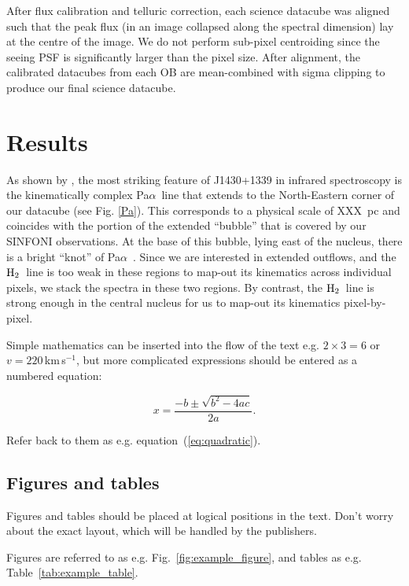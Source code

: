 \documentclass[a4paper,fleqn,usenatbib]{mnras}
\newcommand{\pa}{Pa$\alpha$}
\newcommand{\htwo}{${\rm H_{2}}$}
\begin{document}
After flux calibration and telluric correction, each science datacube was aligned such that the peak flux (in an image collapsed along the spectral dimension) lay at the centre of the image. We do not perform sub-pixel centroiding since the seeing PSF is significantly larger than the pixel size. After alignment, the calibrated datacubes from each OB are mean-combined with sigma clipping to produce our final science datacube.

\section{Results}
As shown by \cite{Ramos-Almeida17}, the most striking feature of J1430+1339 in infrared spectroscopy is the kinematically complex \pa\ line that extends to the North-Eastern corner of our datacube (see Fig. \ref{Pa}). This corresponds to a physical scale of XXX~pc and coincides with the portion of the extended ``bubble'' that is covered by our SINFONI observations. At the base of this bubble, lying east of the nucleus, there is a bright ``knot'' of \pa\ . Since we are interested in extended outflows, and the \htwo\ line is too weak in these regions to map-out its kinematics across individual pixels, we stack the spectra in these two regions. By contrast, the \htwo\ line is strong enough in the central nucleus for us to map-out its kinematics pixel-by-pixel.



\label{sec:maths} %

Simple mathematics can be inserted into the flow of the text e.g. $2\times3=6$
or $v=220$\,km\,s$^{-1}$, but more complicated expressions should be entered
as a numbered equation:

\begin{equation}
    x=\frac{-b\pm\sqrt{b^2-4ac}}{2a}.
	\label{eq:quadratic}
\end{equation}

Refer back to them as e.g. equation~(\ref{eq:quadratic}).

\subsection{Figures and tables}

Figures and tables should be placed at logical positions in the text. Don't
worry about the exact layout, which will be handled by the publishers.

Figures are referred to as e.g. Fig.~\ref{fig:example_figure}, and tables as
e.g. Table~\ref{tab:example_table}.
\end{document}
